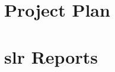 \documentclass[draft,final]{vutinfth} %
\begin{document}


\tableofcontents %

\mainmatter











\begin{appendices}


\chapter{Project Plan}
\label{chap:project-plan}

% 

\chapter{\acrfull{slr} Reports}
\label{chap:slr-report}

\end{appendices}







\end{document}

